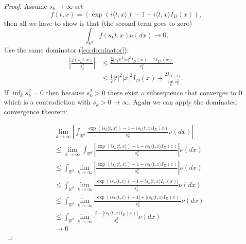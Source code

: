 \documentclass[a4paper,11pt]{article}
\begin{document}
\begin{proof}
    Assume $s_{k}\rightarrow \infty$ set
    \begin{equation}
        f(t,x) =  ( \exp ( i \langle t, x \rangle)-1-i \langle t, x \rangle I_{D} ( x ) ),
    \end{equation}
    then all we have to show is that (the second term goes to zero)
    \begin{equation}
        \int_{\mathbb{R}^{d}} f(s_{k}t,x) \nu( d x ) \rightarrow 0
        .
    \end{equation}
    Use the same dominator (\ref{eq:dominator}):
    \begin{align}
        \left|\frac{f(s_{k}t,x)}{s_{k}^{2}}\right| & \le \frac{\frac{1}{2} |s_{k} t|^{2} |x|^{2} I_{D}(x) + 2 I_{D^{c}}(x)}{ s_{k}^{2}}  \\
                                                   & \le \frac{1}{2} |t|^{2} |x|^{2} I_{D}(x) + \frac{2I_{D^{c}(x)}}{\inf_{k} s_{k}^{2}}
        .
    \end{align}
    If $\inf_{k} s_{k}^{2}= 0$ then because $s_k^{2}>0$ there exist a subsequence that
    converges to $0$ which is a contradiction with $s_{k}>0 \rightarrow \infty$.
    Again we can apply the dominated convergence theorem:

    \begin{align}
         & \lim_{k \to \infty} \left|\int_{\mathbb{R}^{d}} \frac{\exp ( i s_k \langle t, x \rangle)-1-i s_k \langle t, x \rangle I_{D} ( x )} {s_k^{2}} \nu( d x ) \right|                  \\
         & \le\lim_{k \to \infty} \int_{\mathbb{R}^{d}} \left|\frac{\exp ( i s_k \langle t, x \rangle)-1-i s_k \langle t, x \rangle I_{D} ( x )} {s_k^{2}}\right|  \nu( d x )               \\
         & \le \int_{\mathbb{R}^{d}}\lim_{k \to \infty} \left|\frac{\exp ( i s_k \langle t, x \rangle)-1-i s_k \langle t, x \rangle I_{D} ( x )} {s_k^{2}}\right|  \nu( d x )               \\
         & \le \int_{\mathbb{R}^{d}}\lim_{k \to \infty} \frac{\left|\exp ( i s_k \langle t, x \rangle)-1-i s_k \langle t, x \rangle I_{D} ( x )\right|} {s_k^{2}}  \nu( d x )               \\
         & \le \int_{\mathbb{R}^{d}}\lim_{k \to \infty} \frac{\left|\exp ( i s_k \langle t, x \rangle)-1\right|+ \left|i s_k \langle t, x \rangle I_{D} ( x )\right|} {s_k^{2}}  \nu( d x ) \\
         & \le \int_{\mathbb{R}^{d}}\lim_{k \to \infty} \frac{2+ \left|i s_k \langle t, x \rangle I_{D} ( x )\right|} {s_k^{2}}  \nu( d x )                                                 \\
         & \rightarrow 0
    \end{align}


\end{proof}
\end{document}
